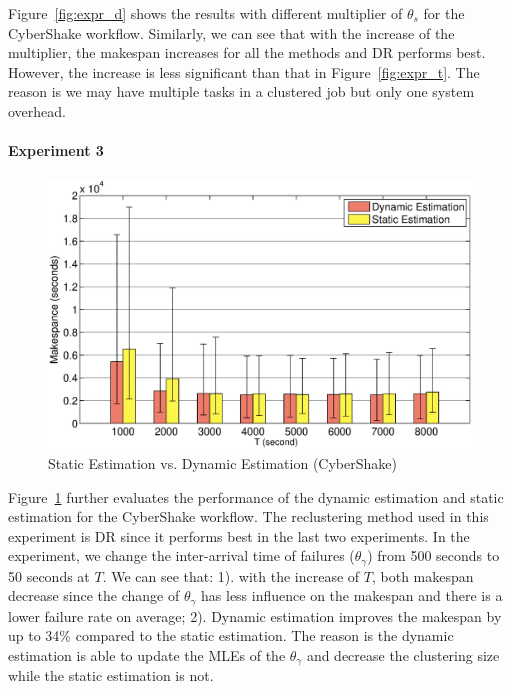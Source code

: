 \documentclass{IOS-Book-Article}
\begin{document}
Figure~\ref{fig:expr_d} shows the results with different multiplier of $\theta_{s}$ for the CyberShake workflow. Similarly, we can see that with the increase of the multiplier, the makespan increases for all the methods and DR performs best. However, the increase is less significant than that in Figure~\ref{fig:expr_t}. The reason is we may have multiple tasks in a clustered job but only one system overhead. 


\paragraph{\textbf{Experiment 3}}
\begin{figure}[!htb]
\centering
  \includegraphics[width=1\linewidth]{versus.eps}
  \caption{Static Estimation vs. Dynamic Estimation (CyberShake)}
  \label{fig:expr_static_dynamic}
\end{figure}

Figure~\ref{fig:expr_static_dynamic} further evaluates the performance of the dynamic estimation and static estimation for the CyberShake workflow. The reclustering method used in this experiment is DR since it performs best in the last two experiments. In the experiment, we change the inter-arrival time of failures ($\theta_{\gamma}$) from 500 seconds to 50 seconds at $T$. We can see that: 1). with the increase of $T$, both makespan decrease since the change of  $\theta_{\gamma}$ has less influence on the makespan and there is a lower failure rate on average; 2). Dynamic estimation improves the makespan by up to 34\% compared to the static estimation. The reason is the dynamic estimation is able to update the MLEs of the $\theta_{\gamma}$ and decrease the clustering size while the static estimation is not. 
\end{document}
